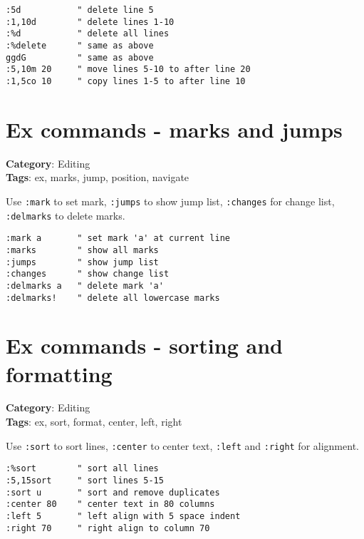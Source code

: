 {{{{\begin{Exa*}{}
\begin{Verbatim}[fontsize=\footnotesize, breaklines, breakanywhere]
:5d           " delete line 5
:1,10d        " delete lines 1-10
:%d           " delete all lines
:%delete      " same as above
ggdG          " same as above
:5,10m 20     " move lines 5-10 to after line 20
:1,5co 10     " copy lines 1-5 to after line 10
\end{Verbatim}
\end{Exa*}

\section{Ex commands - marks and jumps}

\textbf{Category}: Editing\\ \textbf{Tags}: ex, marks, jump, position, navigate
\vspace{0.5cm}

Use {\footnotesize \Verb§:mark§} to set mark, {\footnotesize \Verb§:jumps§} to show jump list, {\footnotesize \Verb§:changes§} for change list, {\footnotesize \Verb§:delmarks§} to delete marks.

\begin{Exa*}{}
\begin{Verbatim}[fontsize=\footnotesize, breaklines, breakanywhere]
:mark a       " set mark 'a' at current line
:marks        " show all marks
:jumps        " show jump list
:changes      " show change list
:delmarks a   " delete mark 'a'
:delmarks!    " delete all lowercase marks
\end{Verbatim}
\end{Exa*}

\section{Ex commands - sorting and formatting}

\textbf{Category}: Editing\\ \textbf{Tags}: ex, sort, format, center, left, right
\vspace{0.5cm}

Use {\footnotesize \Verb§:sort§} to sort lines, {\footnotesize \Verb§:center§} to center text, {\footnotesize \Verb§:left§} and {\footnotesize \Verb§:right§} for alignment.

\begin{Exa*}{}
\begin{Verbatim}[fontsize=\footnotesize, breaklines, breakanywhere]
:%sort        " sort all lines
:5,15sort     " sort lines 5-15
:sort u       " sort and remove duplicates
:center 80    " center text in 80 columns
:left 5       " left align with 5 space indent
:right 70     " right align to column 70
\end{Verbatim}
\end{Exa*}

}}}}
